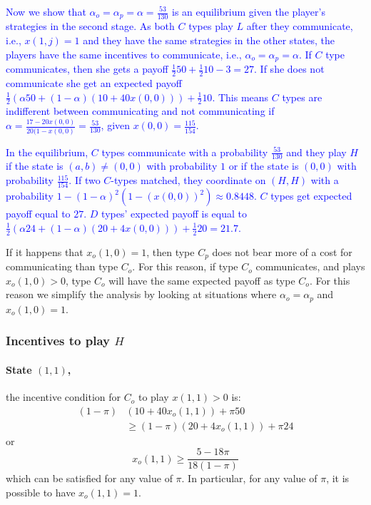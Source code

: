 \documentclass[12pt]{article}
\theoremstyle{break}
\begin{document}
\textcolor{blue}{Now we show that $\alpha_o=\alpha_p=\alpha=\frac{53}{130}$ is an equilibrium given the player's strategies in the second stage. As both $C$ types play $L$ after they communicate, i.e., $x(1,j)=1$ and they have the same strategies in the other states, the players have the same incentives to communicate, i.e., $\alpha_o=\alpha_p=\alpha$. If $C$ type communicates, then she gets a payoff $\frac{1}{2}50+\frac{1}{2}10-3=27$. If she does not communicate she get an expected payoff $\frac{1}{2}\left(\alpha 50 + (1-\alpha) (10+40x(0,0))\right)+\frac{1}{2} 10$. This means $C$ types are indifferent between communicating and not communicating if $\alpha=\frac{17-20x(0,0)}{20(1-x(0,0)}=\frac{53}{130}$, given $x(0,0)=\frac{115}{154}$.}

\textcolor{blue}{In the equilibrium, $C$ types communicate with a probability $\frac{53}{130}$ and they play $H$ if the state is $(a,b)\neq (0,0)$ with probability $1$ or if the state is $(0,0)$ with probability $\frac{115}{154}$. If two $C$-types matched, they coordinate on $(H,H)$ with a probability $1-(1-\alpha)^2 (1-(x(0,0))^2)\approx 0.8448$. $C$ types get expected payoff equal to $27$. $D$ types' expected payoff is equal to $\frac{1}{2}\left(\alpha 24 +(1-\alpha) (20+4 x(0,0)) \right) + \frac{1}{2} 20=21.7$.}

If it happens that $x_o(1,0)=1$, then type $C_p$ does not bear more of a cost for communicating than type $C_o$. For this reason, if type $C_o$ communicates, and plays $x_o(1,0)>0$, type $C_o$ will have the same expected payoff as type $C_o$. For this reason we simplify the analysis by looking at situations where $\alpha_o=\alpha_p$ and $x_o(1,0)=1$.  
%
\subsubsection*{Incentives to play $H$}
\paragraph{State $(1,1)$,} the incentive condition for $C_o$ to play $x(1,1)>0$ is:
\begin{align*}
	(1-\pi) &(10+40x_o(1,1))+\pi 50\\
		&\geq (1-\pi) (20+4x_o(1,1))+\pi 24
\end{align*}
or
\[
x_o(1,1)\geq \frac{5-18\pi}{18(1-\pi)}
\]
which can  be satisfied for any value of $\pi$. In particular, for any value of $\pi$, it is possible to have $x_o(1,1)=1$.
\end{document}
